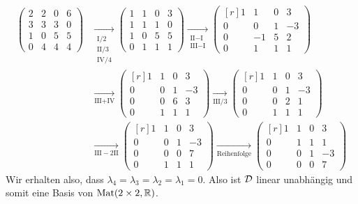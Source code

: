 \documentclass[a4paper,10pt]{article}
\begin{document}
\begin{align*}
 \begin{pmatrix*}
  2 & 2 & 0 & 6 \\
  3 & 3 & 3 & 0 \\
  1 & 0 & 5 & 5 \\
  0 & 4 & 4 & 4
 \end{pmatrix*}
 &\xrightarrow[\substack{\text{I}/2 \\ \text{II}/3 \\ \text{IV}/4}]{}
 \begin{pmatrix*}
  1 & 1 & 0 & 3 \\
  1 & 1 & 1 & 0 \\
  1 & 0 & 5 & 5 \\
  0 & 1 & 1 & 1
 \end{pmatrix*}
 \xrightarrow[\substack{\text{II}-\text{I} \\ \text{III}-\text{I}}]{}
 \begin{pmatrix*}[r]
  1 &  1 & 0 &  3 \\
  0 &  0 & 1 & -3 \\
  0 & -1 & 5 &  2 \\
  0 &  1 & 1 &  1
 \end{pmatrix*}
 \\
 &\xrightarrow[\text{III}+\text{IV}]{}
 \begin{pmatrix*}[r]
  1 & 1 & 0 &  3 \\
  0 & 0 & 1 & -3 \\
  0 & 0 & 6 &  3 \\
  0 & 1 & 1 &  1
 \end{pmatrix*}
 \xrightarrow[\text{III}/3]{}
 \begin{pmatrix*}[r]
  1 & 1 & 0 &  3 \\
  0 & 0 & 1 & -3 \\
  0 & 0 & 2 &  1 \\
  0 & 1 & 1 &  1
 \end{pmatrix*}
 \\
 &\xrightarrow[\text{III}-2\text{II}]{}
 \begin{pmatrix*}[r]
  1 & 1 & 0 &  3 \\
  0 & 0 & 1 & -3 \\
  0 & 0 & 0 &  7 \\
  0 & 1 & 1 &  1
 \end{pmatrix*}
 \xrightarrow[\text{Reihenfolge}]{}
 \begin{pmatrix*}[r]
  1 & 1 & 0 &  3 \\
  0 & 1 & 1 &  1 \\
  0 & 0 & 1 & -3 \\
  0 & 0 & 0 &  7
 \end{pmatrix*}
\end{align*}
Wir erhalten also, dass $\lambda_4 = \lambda_3 = \lambda_2 = \lambda_1 = 0$. Also ist $\mathcal{D}$ linear unabhängig und somit eine Basis von $\mathrm{Mat}(2 \times 2, \mathbb{R})$.
\end{document}
